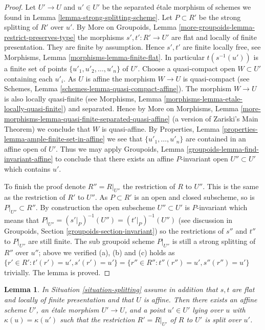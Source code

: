 \documentclass{stacks-project}
\theoremstyle{plain}
\newtheorem{lemma}[subsection]{Lemma}
\theoremstyle{definition}
\theoremstyle{remark}
\numberwithin{equation}{subsection}
\begin{document}
\begin{proof}
Let $U' \to U$ and $u' \in U'$ be the separated \'etale morphism of schemes
we found in Lemma \ref{lemma-strong-splitting-scheme}.
Let $P \subset R'$ be the strong splitting of $R'$ over $u'$. By
More on Groupoids, Lemma \ref{more-groupoids-lemma-restrict-preserves-type}
the morphisms $s', t' : R' \to U'$ are flat and locally of finite presentation.
They are finite by assumption. Hence $s', t'$ are finite locally
free, see
Morphisms, Lemma \ref{morphisms-lemma-finite-flat}.
In particular $t(s^{-1}(u'))$ is a finite set of points
$\{u'_1, u'_2, \ldots, u'_n\}$ of $U'$. Choose a quasi-compact open
$W \subset U'$ containing each $u'_i$. As $U$ is affine the morphism
$W \to U$ is quasi-compact (see
Schemes, Lemma \ref{schemes-lemma-quasi-compact-affine}).
The morphism $W \to U$ is also locally quasi-finite (see
Morphisms, Lemma \ref{morphisms-lemma-etale-locally-quasi-finite})
and separated. Hence by
More on Morphisms,
Lemma \ref{more-morphisms-lemma-quasi-finite-separated-quasi-affine}
(a version of Zariski's Main Theorem)
we conclude that $W$ is quasi-affine. By
Properties, Lemma \ref{properties-lemma-ample-finite-set-in-affine}
we see that $\{u'_1, \ldots, u'_n\}$ are contained in an affine
open of $U'$. Thus we may apply
Groupoids, Lemma \ref{groupoids-lemma-find-invariant-affine}
to conclude that there exists an affine $P$-invariant open
$U'' \subset U'$ which contains $u'$.

\medskip\noindent
To finish the proof denote $R'' = R|_{U''}$ the restriction of $R$
to $U''$. This is the same as the restriction of $R'$ to $U''$.
As $P \subset R'$ is an open and closed subscheme, so is
$P|_{U''} \subset R''$. By construction the open subscheme $U'' \subset U'$
is $P$-invariant which means that
$P|_{U''} = (s'|_P)^{-1}(U'') = (t'|_P)^{-1}(U'')$
(see discussion in
Groupoids, Section \ref{groupoids-section-invariant})
so the restrictions of $s''$ and $t''$ to $P|_{U''}$ are still finite.
The sub groupoid scheme $P|_{U''}$ is still a strong splitting of
$R''$ over $u''$; above we verified (a), (b) and (c) holds as
$\{r' \in R': t'(r') = u', s'(r') = u'\} =
\{r'' \in R'': t''(r'') = u', s''(r'') = u'\}$ trivially.
The lemma is proved.
\end{proof}

\begin{lemma}
\label{lemma-splitting-affine-scheme}
In Situation \ref{situation-splitting} assume in addition that
$s, t$ are flat and locally of finite presentation and that $U$ is affine.
Then there exists an affine scheme $U'$, an \'etale morphism
$U' \to U$, and a point $u' \in U'$ lying over $u$ with
$\kappa(u) = \kappa(u')$ such that the restriction $R' = R|_{U'}$ of
$R$ to $U'$ is split over $u'$.
\end{lemma}
\end{document}
